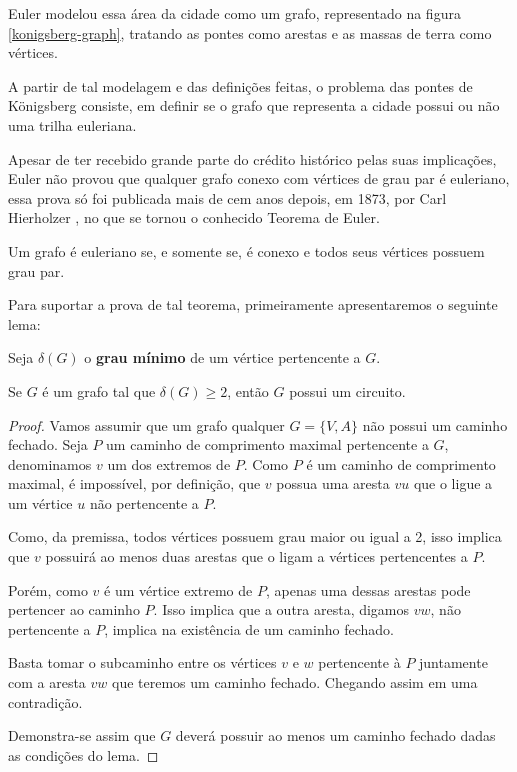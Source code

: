 Euler modelou essa área da cidade como um grafo, representado na figura \ref{konigsberg-graph}, tratando as pontes como arestas e as massas de terra como vértices.

A partir de tal modelagem e das definições feitas, o problema das pontes de Königsberg consiste, em definir se o grafo que representa a cidade possui ou não uma trilha euleriana. 

Apesar de ter recebido grande parte do crédito histórico pelas suas implicações, Euler não provou que qualquer grafo conexo com vértices de grau par é euleriano, essa prova só foi publicada mais de cem anos depois, em 1873, por Carl Hierholzer \cite{hierholzer}, no que se tornou o conhecido Teorema de Euler.


\begin{theorem}
    Um grafo é euleriano se, e somente se, é conexo e todos seus vértices possuem grau par.
    \label{euler}
\end{theorem}

Para suportar a prova de tal teorema, primeiramente apresentaremos o seguinte lema:

Seja $\delta(G)$ o \textbf{grau mínimo} de um vértice pertencente a $G$.

\begin{lemma}
	Se $G$ é um grafo tal que $\delta(G) \geq 2$, então $G$ possui um circuito.
	\label{lema}
\end{lemma}

\begin{proof}
	Vamos assumir que um grafo qualquer $G = \{V, A\}$ não possui um caminho fechado. 
	Seja $P$ um caminho de comprimento maximal pertencente a $G$, denominamos $v$ um dos extremos de $P$. 
	Como $P$ é um caminho de comprimento maximal, é impossível, por definição, que $v$ possua uma aresta $vu$ que o ligue a um vértice $u$ não pertencente a $P$.
	
	Como, da premissa, todos vértices possuem grau maior ou igual a 2, isso implica que $v$ possuirá ao menos duas arestas que o ligam a vértices pertencentes a $P$.

	Porém, como $v$ é um vértice extremo de $P$, apenas uma dessas arestas pode pertencer ao caminho $P$. Isso implica que a outra aresta, digamos $vw$, não pertencente a $P$, implica na existência de um caminho fechado.

	Basta tomar o subcaminho entre os vértices $v$ e $w$ pertencente à $P$ juntamente com a aresta $vw$ que teremos um caminho fechado. Chegando assim em uma contradição.

	Demonstra-se assim que $G$ deverá possuir ao menos um caminho fechado dadas as condições do lema.
\end{proof}

